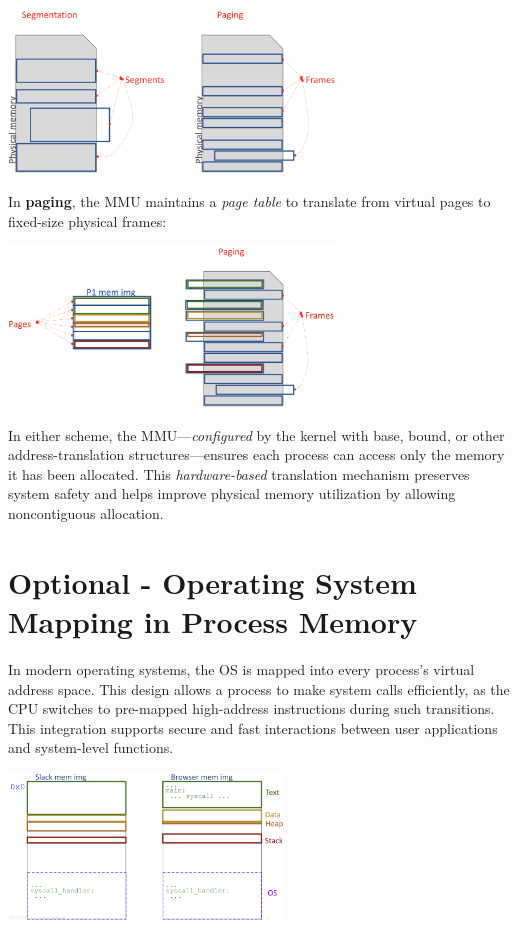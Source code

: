 \documentclass[../../compsys.tex]{subfiles}
\begin{document}
\begin{center}
  \includegraphics[width=0.65\textwidth]{chapters/L4/images/page-segment.png}
\end{center}

\noindent In \textbf{paging}, the MMU maintains a \emph{page table} to translate from virtual pages to fixed-size physical frames:

\begin{center}
  \includegraphics[width=0.65\textwidth]{chapters/L4/images/paging.png}
\end{center}

\noindent In either scheme, the MMU---\emph{configured} by the kernel with base, bound, or other address-translation structures---ensures each process can access only the memory it has been allocated. This \emph{hardware-based} translation mechanism preserves system safety and helps improve physical memory utilization by allowing noncontiguous allocation.
\newpage
\section{Optional - Operating System Mapping in Process Memory}
In modern operating systems, the OS is mapped into every process's virtual address space. This design allows a process to make system calls efficiently, as the CPU switches to pre-mapped high-address instructions during such transitions. This integration supports secure and fast interactions between user applications and system-level functions.

\begin{center}
  \includegraphics[width=0.55\textwidth]{chapters/L4/images/os-everywhere.png}
\end{center}
\end{document}
